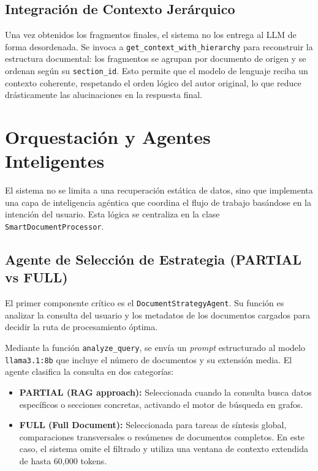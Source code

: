 \subsection{Integración de Contexto Jerárquico}
Una vez obtenidos los fragmentos finales, el sistema no los entrega al LLM de forma desordenada. Se invoca a \texttt{get\_context\_with\_hierarchy} para reconstruir la estructura documental: los fragmentos se agrupan por documento de origen y se ordenan según su \texttt{section\_id}. Esto permite que el modelo de lenguaje reciba un contexto coherente, respetando el orden lógico del autor original, lo que reduce drásticamente las alucinaciones en la respuesta final.

\newpage
\section{Orquestación y Agentes Inteligentes}

El sistema no se limita a una recuperación estática de datos, sino que implementa una capa de inteligencia agéntica que coordina el flujo de trabajo basándose en la intención del usuario. Esta lógica se centraliza en la clase \texttt{SmartDocumentProcessor}.

\subsection{Agente de Selección de Estrategia (PARTIAL vs FULL)}
El primer componente crítico es el \texttt{DocumentStrategyAgent}. Su función es analizar la consulta del usuario y los metadatos de los documentos cargados para decidir la ruta de procesamiento óptima.

Mediante la función \texttt{analyze\_query}, se envía un \textit{prompt} estructurado al modelo \texttt{llama3.1:8b} que incluye el número de documentos y su extensión media. El agente clasifica la consulta en dos categorías:
\begin{itemize}
    \item \textbf{PARTIAL (RAG approach):} Seleccionada cuando la consulta busca datos específicos o secciones concretas, activando el motor de búsqueda en grafos.
    \item \textbf{FULL (Full Document):} Seleccionada para tareas de síntesis global, comparaciones transversales o resúmenes de documentos completos. En este caso, el sistema omite el filtrado y utiliza una ventana de contexto extendida de hasta 60,000 tokens.
\end{itemize}


